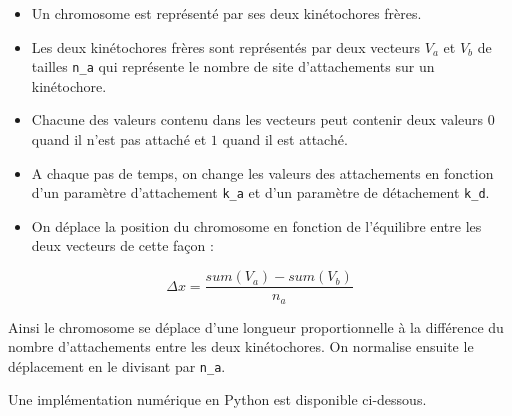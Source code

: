 \documentclass[12pt,a4paper,twoside,openright]{book}
\begin{document}
\begin{itemize}
\item
  Un chromosome est représenté par ses deux kinétochores frères.
\item
  Les deux kinétochores frères sont représentés par deux vecteurs
  \(V_a\) et \(V_b\) de tailles \texttt{n\_a} qui représente le nombre
  de site d'attachements sur un kinétochore.
\item
  Chacune des valeurs contenu dans les vecteurs peut contenir deux
  valeurs \(0\) quand il n'est pas attaché et \(1\) quand il est
  attaché.
\item
  A chaque pas de temps, on change les valeurs des attachements en
  fonction d'un paramètre d'attachement \texttt{k\_a} et d'un paramètre
  de détachement \texttt{k\_d}.
\item
  On déplace la position du chromosome en fonction de l'équilibre entre
  les deux vecteurs de cette façon :
\end{itemize}

\[
\Delta x = \frac{sum(V_a) - sum(V_b)}{n_a}
\]

Ainsi le chromosome se déplace d'une longueur proportionnelle à la
différence du nombre d'attachements entre les deux kinétochores. On
normalise ensuite le déplacement en le divisant par \texttt{n\_a}.

Une implémentation numérique en Python est disponible ci-dessous.
\end{document}
